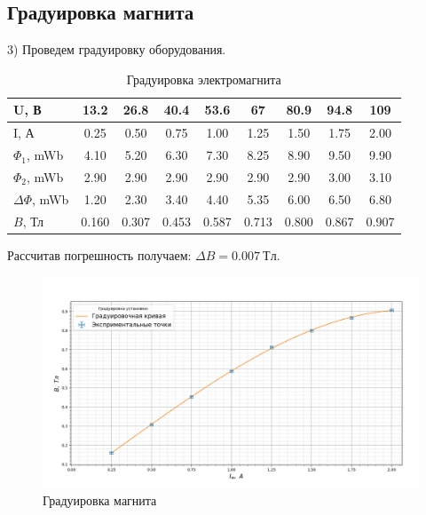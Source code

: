 \documentclass[a4paper, 12pt]{article}%
\begin{document}
	\subsection*{Градуировка магнита}
	3) Проведем градуировку оборудования.\\
	\begin{table}[H]
		\centering
		\begin{tabular}{|l|c|c|c|c|c|c|c|c|}
			\hline
			U, В     & 13.2  & 26.8  & 40.4  & 53.6  & 67    & 80.9  & 94.8  & 109   \\ \hline
			I, А     & 0.25  & 0.50  & 0.75  & 1.00  & 1.25  & 1.50  & 1.75  & 2.00  \\ \hline
			$\Phi_1$, mWb & 4.10  & 5.20  & 6.30  & 7.30  & 8.25  & 8.90  & 9.50  & 9.90  \\ \hline
			$\Phi_2$, mWb      & 2.90  & 2.90  & 2.90  & 2.90  & 2.90  & 2.90  & 3.00  & 3.10  \\ \hline
			$\Delta \Phi$, mWb  & 1.20  & 2.30  & 3.40  & 4.40  & 5.35  & 6.00  & 6.50  & 6.80  \\ \hline
			$B$, Тл        & 0.160 & 0.307 & 0.453 & 0.587 & 0.713 & 0.800 & 0.867 & 0.907 \\ \hline
		\end{tabular}
	\caption{Градуировка электромагнита}
	\end{table}
	Рассчитав погрешность получаем: $\Delta B = 0.007~Тл$.\\
	\begin{figure}[H]
		\centering
		\includegraphics[width=0.8\linewidth]{graduir}
		\caption{Градуировка магнита}
		\label{fig:graduir}
	\end{figure}
\end{document}
